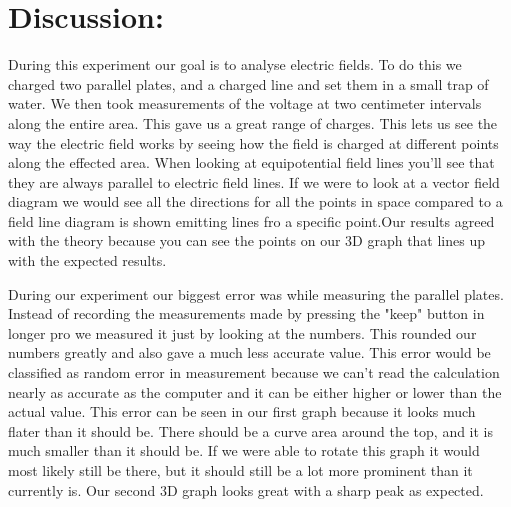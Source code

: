 \documentclass{article}
\begin{document}
\section*{Discussion:}
\doublespace
During this experiment our goal is to analyse electric fields.  To do this we charged two parallel plates, and a charged line and set them in a small trap of water.  We then took measurements of the voltage at two centimeter intervals along the entire area.  This gave us a great range of charges.  This lets us see the way the electric field works by seeing how the field is charged at different points along the effected area.  When looking at equipotential field lines you'll see that they are always parallel to electric field lines.  If we were to look at a vector field diagram we would see all the directions for all the points in space compared to a field line diagram is shown emitting lines fro a specific point.Our results agreed with the theory because you can see the points on our 3D graph that lines up with the expected results.

  During our experiment our biggest error was while measuring the parallel plates.  Instead of recording the measurements made by pressing the "keep" button in longer pro we measured it just by looking at the numbers.  This rounded our numbers greatly and also gave a much less accurate value.  This error would be classified as random error in measurement because we can't read the calculation nearly as accurate as the computer and it can be either higher or lower than the actual value.  This error can be seen in our first graph because it looks much flater than it should be.  There should be a curve area around the top, and it is much smaller than it should be.  If we were able to rotate this graph it would most likely still be there, but it should still be a lot more prominent than it currently is.  Our second 3D graph looks great with a sharp peak as expected.
  
\end{document}
